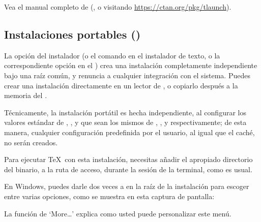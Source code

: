 \documentclass{article}
\begin{document}
Vea el manual completo de  (, o visitando \url{https://ctan.org/pkg/tlaunch}).

\subsection{Instalaciones portables (\USB{})}
\label{sec:portable-tl}

La opción  del instalador (o el comando
 en el instalador de texto, o la correspondiente
opción en el \GUI{}) crea una instalación completamente
independiente bajo una raíz común, y renuncia a cualquier
integración con el sistema. Puedes crear una instalación
directamente en un lector de \USB{}, o copiarlo después a la
memoria del \USB{}.

Técnicamente, la instalación portátil es hecha independiente,
al configurar los valores estándar de ,
, y  que sean los mismos de
, , y 
respectivamente; de esta manera, cualquier configuración predefinida
por el usuario, al igual que el caché, no serán creados.
 
Para ejecutar \TeX\ con esta instalación, necesitas añadir el
apropiado directorio del binario, a la ruta de acceso, durante la sesión
de la terminal, como es usual.

En Windows, puedes darle dos veces a 
 en la raíz de la instalación para escoger
entre varias opciones, como se muestra en esta captura de pantalla:

\medskip
{}
\smallskip

\noindent La función de `More\ldots' explica como usted puede
personalizar este menú. 
\end{document}
